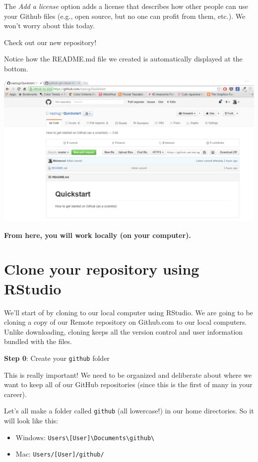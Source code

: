 \documentclass[]{book}
\providecommand{\tightlist}{%
  \setlength{\itemsep}{0pt}\setlength{\parskip}{0pt}}
\theoremstyle{definition}
\theoremstyle{definition}
\theoremstyle{definition}
\theoremstyle{remark}
\begin{document}
The \emph{Add a license} option adds a license that describes how other
people can use your Github files (e.g., open source, but no one can
profit from them, etc.). We won't worry about this today.

Check out our new repository!

Notice how the README.md file we created is automatically displayed at
the bottom.

\includegraphics{img/new_repository.png}

\textbf{From here, you will work locally (on your computer).}

\section{Clone your repository using
RStudio}\label{clone-your-repository-using-rstudio}

We'll start of by cloning to our local computer using RStudio. We are
going to be cloning a copy of our Remote repository on Github.com to our
local computers. Unlike downloading, cloning keeps all the version
control and user information bundled with the files.

\textbf{Step 0}: Create your \texttt{github} folder

This is really important! We need to be organized and deliberate about
where we want to keep all of our GitHub repositories (since this is the
first of many in your career).

Let's all make a folder called \texttt{github} (all lowercase!) in our
home directories. So it will look like this:

\begin{itemize}
\tightlist
\item
  Windows:
  \texttt{Users\textbackslash{}{[}User{]}\textbackslash{}Documents\textbackslash{}github\textbackslash{}}
\item
  Mac: \texttt{Users/{[}User{]}/github/}
\end{itemize}
\end{document}

